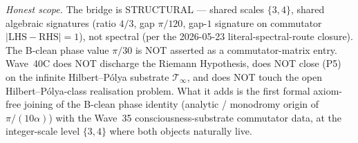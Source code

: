 \begin{remark}
\emph{Honest scope.} The bridge is STRUCTURAL --- shared scales $\{3, 4\}$, shared algebraic signatures (ratio $4/3$, gap $\pi/120$, gap-$1$ signature on commutator $|\mathrm{LHS} - \mathrm{RHS}| = 1$), not spectral (per the 2026-05-23 literal-spectral-route closure). The B-clean phase value $\pi/30$ is NOT asserted as a commutator-matrix entry. Wave~40C does NOT discharge the Riemann Hypothesis, does NOT close (P5) on the infinite Hilbert--P\'olya substrate $\mathcal{T}_\infty$, and does NOT touch the open Hilbert--P\'olya-class realisation problem. What it adds is the first formal axiom-free joining of the B-clean phase identity (analytic / monodromy origin of $\pi/(10\alpha)$) with the Wave~35 consciousness-substrate commutator data, at the integer-scale level $\{3, 4\}$ where both objects naturally live.
\end{remark}

